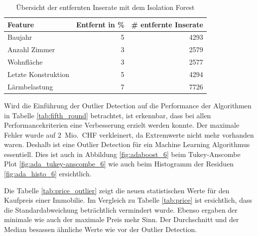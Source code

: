 \begin{table}[ht]
\centering
{}
\begin{tabular}{@{}lrr@{}}
\toprule
Feature & Entfernt in \% & \# entfernte Inserate\\
\midrule
Baujahr & 5 & 4293\\
Anzahl Zimmer & 3 & 2579\\
Wohnfläche & 3 & 2577\\
Letzte Konstruktion & 5 & 4294\\
Lärmbelastung & 7 & 7726\\
\bottomrule
\end{tabular}
\caption{Übersicht der entfernten Inserate mit dem Isolation Forest}
\label{tab:iso_forest}
\end{table}
%
\begin{table}[ht]
\centering
{}
\caption{Ergebnisse mit Einbezug einer Outlier Detection}
\label{tab:fifth_round}
\end{table}

Wird die Einführung der Outlier Detection auf die Performance der Algorithmen in Tabelle \ref{tab:fifth_round} betrachtet, ist erkennbar, dass bei allen Performancekriterien eine Verbesserung erzielt werden konnte. Der maximale Fehler wurde auf 2~Mio.~CHF verkleinert, da Extremwerte nicht mehr vorhanden waren. Deshalb ist eine Outlier Detection für ein Machine Learning Algorithmus essentiell. Dies ist auch in Abbildung \ref{fig:adaboost_6} beim Tukey-Anscombe Plot \ref{fig:ada_tukey-anscombe_6} wie auch beim Histogramm der Residuen \ref{fig:ada_histo_6} ersichtlich.

Die Tabelle \ref{tab:price_outlier} zeigt die neuen statistischen Werte für den Kaufpreis einer Immobilie. Im Vergleich zu Tabelle \ref{tab:price} ist ersichtlich, dass die Standardabweichung beträchtlich vermindert wurde. Ebenso ergaben der minimale wie auch der maximale Preis mehr Sinn. Der Durchschnitt und der Median besassen ähnliche Werte wie vor der Outlier Detection.

